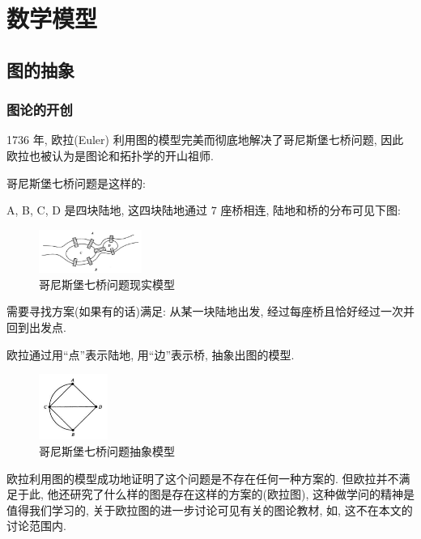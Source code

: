 \section{数学模型}

\subsection{图的抽象}
\subsubsection{图论的开创}
1736 年, 欧拉(Euler) 利用图的模型完美而彻底地解决了哥尼斯堡七桥问题,
因此欧拉也被认为是图论和拓扑学的开山祖师.

哥尼斯堡七桥问题是这样的:

A, B, C, D 是四块陆地, 这四块陆地通过 $ 7 $ 座桥相连, 陆地和桥的分布可见下图:
\begin{figure}[H]
  \begin{center}
    \includegraphics[width=0.3\textwidth]{./figures/bridge.png}
  \end{center}
  \caption{哥尼斯堡七桥问题现实模型}
\end{figure}

需要寻找方案(如果有的话)满足: 从某一块陆地出发,
经过每座桥且恰好经过一次并回到出发点.

欧拉通过用``点''表示陆地, 用``边''表示桥, 抽象出图的模型.
\begin{figure}[H]
  \begin{center}
    \includegraphics[width=0.2\textwidth]{./figures/bridge_graph.png}
  \end{center}
  \caption{哥尼斯堡七桥问题抽象模型}
\end{figure}

欧拉利用图的模型成功地证明了这个问题是不存在任何一种方案的.
但欧拉并不满足于此, 他还研究了什么样的图是存在这样的方案的(欧拉图),
这种做学问的精神是值得我们学习的, 关于欧拉图的进一步讨论可见有关的图论教材,
如\cite{ref5}, 这不在本文的讨论范围内.

